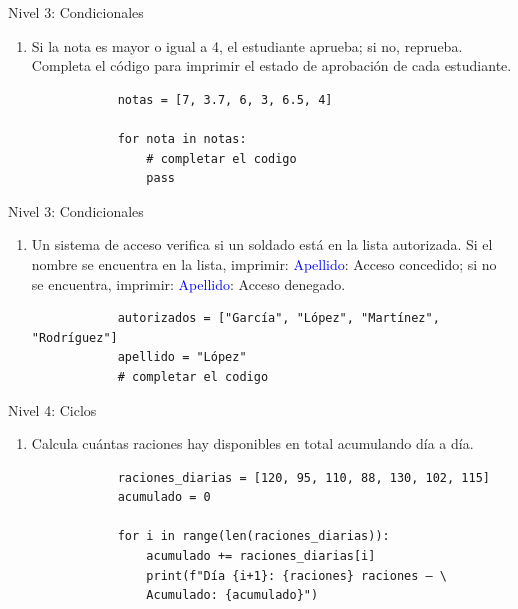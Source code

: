 \documentclass{beamer}
\begin{document}
    \begin{frame}[fragile, t]{Nivel 3: Condicionales}
        \begin{enumerate}
            \item[11.] Si la nota es mayor o igual a 4, el estudiante aprueba; si no, reprueba.
            Completa el código para imprimir el estado de aprobación de cada estudiante.
            \begin{verbatim}
            notas = [7, 3.7, 6, 3, 6.5, 4]

            for nota in notas:
                # completar el codigo
                pass
            \end{verbatim}
        \end{enumerate}
    \end{frame}

    \begin{frame}[fragile, t]{Nivel 3: Condicionales}
        \begin{enumerate}
            \item[12.] Un sistema de acceso verifica si un soldado está en la lista autorizada. 
            Si el nombre se encuentra en la lista, imprimir: \textcolor{blue}{Apellido}: Acceso concedido; 
            si no se encuentra, imprimir: \textcolor{blue}{Apellido}: Acceso denegado.
            
            \begin{verbatim}
            autorizados = ["García", "López", "Martínez", "Rodríguez"]
            apellido = "López"
            # completar el codigo
            \end{verbatim}
        \end{enumerate}
    \end{frame}

    \begin{frame}[fragile, t]{Nivel 4: Ciclos}
        \begin{enumerate}
            \item[13.] Calcula cuántas raciones hay disponibles en total acumulando día a día.
            \begin{verbatim}
            raciones_diarias = [120, 95, 110, 88, 130, 102, 115]
            acumulado = 0
            
            for i in range(len(raciones_diarias)):
                acumulado += raciones_diarias[i]
                print(f"Día {i+1}: {raciones} raciones — \
                Acumulado: {acumulado}")
            \end{verbatim}
        \end{enumerate}
    \end{frame}
\end{document}

